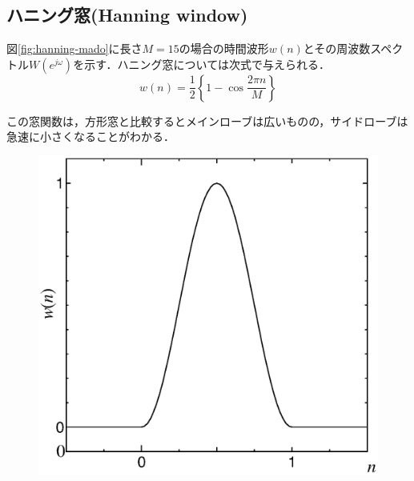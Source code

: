 \subsection{ハニング窓(Hanning window)}

図\ref{fig:hanning-mado}に長さ$M=15$の場合の時間波形$w(n)$とその周波数スペクトル$W(e^{j\omega})$を示す．ハニング窓については次式で与えられる．
\begin{equation}
w(n)= \frac{1}{2} \left \{ 1- \cos \frac{2\pi n}{M}\right \}
\end{equation}

この窓関数は，方形窓と比較するとメインローブは広いものの，サイドローブは急速に小さくなることがわかる．


\begin{figure}[H]
\begin{center}
\begin{minipage}{.38\textwidth}
\begin{center}
\includegraphics[width=.98\textwidth]{fig/haning-mado-a.eps}


\end{center}
\end{minipage}
\end{center}
\end{figure}
